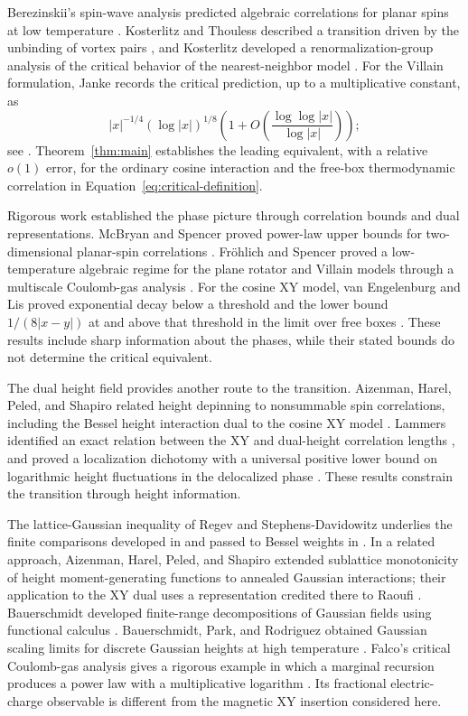 Berezinskii's spin-wave analysis predicted algebraic correlations for
planar spins at low temperature \cite{Berez1971}.  Kosterlitz and
Thouless described a transition driven by the unbinding of vortex
pairs \cite{KT1973}, and Kosterlitz developed a renormalization-group
analysis of the critical behavior of the nearest-neighbor model
\cite{Kosterlitz1974}.  For the Villain formulation, Janke records the
critical prediction, up to a multiplicative constant, as
\[
 |x|^{-1/4}(\log|x|)^{1/8}
 \left(1+O\left(\frac{\log\log|x|}{\log|x|}\right)\right);
\]
see \cite[Section~II, Equations~(2)--(3)]{Janke1997}.
Theorem~\ref{thm:main} establishes the leading equivalent, with a relative
\(o(1)\) error, for the ordinary cosine interaction and the free-box
thermodynamic correlation in Equation~\eqref{eq:critical-definition}.

Rigorous work established the phase picture through correlation
bounds and dual representations.  McBryan and Spencer proved
power-law upper bounds for two-dimensional planar-spin correlations
\cite{McBryanSpencer1977}.  Fr\"ohlich and Spencer proved a
low-temperature algebraic regime for the plane rotator and Villain
models through a multiscale Coulomb-gas analysis
\cite[Theorem~C]{FrohlichSpencer1981}.  For the cosine XY model,
van Engelenburg and Lis proved exponential decay below a threshold
and the lower bound \(1/(8|x-y|)\) at and above that threshold in
the limit over free boxes \cite[Theorem~1]{vanEngelenburgLis2023}.
These results include sharp information about the phases, while their
stated bounds do not determine the critical equivalent.

The dual height field provides another route to the transition.
Aizenman, Harel, Peled, and Shapiro related height depinning to
nonsummable spin correlations, including the Bessel height interaction
dual to the cosine XY model \cite{AHPS2022}.  Lammers identified an
exact relation between the XY and dual-height correlation lengths
\cite[Theorem~1]{Lammers2023}, and proved a localization dichotomy
with a universal positive lower bound on logarithmic height
fluctuations in the delocalized phase \cite{Lammers2026}.
These results constrain the transition through height information.

The lattice-Gaussian inequality of Regev and Stephens-Davidowitz
\cite{RSD2017} underlies the finite comparisons developed in
\cite[Section~2]{B} and passed to Bessel weights in \cite[Lemma~2.2]{C}.  In a related approach,
Aizenman, Harel, Peled, and Shapiro extended sublattice monotonicity of
height moment-generating functions to annealed Gaussian interactions;
their application to the XY dual uses a representation credited there
to Raoufi \cite[Lemma~9.6, Section~10.1, and Appendix~D]{AHPS2022}.
Bauerschmidt developed finite-range decompositions of Gaussian
fields using functional calculus \cite{Bauerschmidt2013}.
Bauerschmidt, Park, and Rodriguez obtained Gaussian scaling limits
for discrete Gaussian heights at high temperature
\cite{BPR2024I,BPR2024II}.  Falco's critical Coulomb-gas analysis gives
a rigorous example in which a marginal recursion produces a power law
with a multiplicative logarithm \cite{Falco2013}.  Its fractional
electric-charge observable is different from the magnetic XY insertion
considered here.

